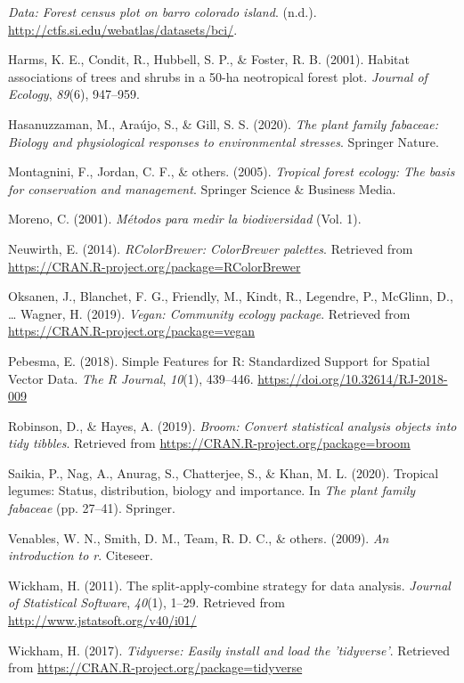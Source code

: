 \documentclass[11pt,]{article}
\begin{document}
\hypertarget{ref-BCIdata}{}
\emph{Data: Forest census plot on barro colorado island}. (n.d.).
\url{http://ctfs.si.edu/webatlas/datasets/bci/}.

\hypertarget{ref-harms2001habitat}{}
Harms, K. E., Condit, R., Hubbell, S. P., \& Foster, R. B. (2001).
Habitat associations of trees and shrubs in a 50-ha neotropical forest
plot. \emph{Journal of Ecology}, \emph{89}(6), 947--959.

\hypertarget{ref-hasanuzzaman2020plant}{}
Hasanuzzaman, M., Araújo, S., \& Gill, S. S. (2020). \emph{The plant
family fabaceae: Biology and physiological responses to environmental
stresses}. Springer Nature.

\hypertarget{ref-montagnini2005tropical}{}
Montagnini, F., Jordan, C. F., \& others. (2005). \emph{Tropical forest
ecology: The basis for conservation and management}. Springer Science \&
Business Media.

\hypertarget{ref-book}{}
Moreno, C. (2001). \emph{Métodos para medir la biodiversidad} (Vol. 1).

\hypertarget{ref-RcolorBrewer}{}
Neuwirth, E. (2014). \emph{RColorBrewer: ColorBrewer palettes}.
Retrieved from \url{https://CRAN.R-project.org/package=RColorBrewer}

\hypertarget{ref-vegan1}{}
Oksanen, J., Blanchet, F. G., Friendly, M., Kindt, R., Legendre, P.,
McGlinn, D., \ldots{} Wagner, H. (2019). \emph{Vegan: Community ecology
package}. Retrieved from \url{https://CRAN.R-project.org/package=vegan}

\hypertarget{ref-sf}{}
Pebesma, E. (2018). Simple Features for R: Standardized Support for
Spatial Vector Data. \emph{The R Journal}, \emph{10}(1), 439--446.
\url{https://doi.org/10.32614/RJ-2018-009}

\hypertarget{ref-broom}{}
Robinson, D., \& Hayes, A. (2019). \emph{Broom: Convert statistical
analysis objects into tidy tibbles}. Retrieved from
\url{https://CRAN.R-project.org/package=broom}

\hypertarget{ref-saikia2020tropical}{}
Saikia, P., Nag, A., Anurag, S., Chatterjee, S., \& Khan, M. L. (2020).
Tropical legumes: Status, distribution, biology and importance. In
\emph{The plant family fabaceae} (pp. 27--41). Springer.

\hypertarget{ref-venables2009introduction}{}
Venables, W. N., Smith, D. M., Team, R. D. C., \& others. (2009).
\emph{An introduction to r}. Citeseer.

\hypertarget{ref-plyr}{}
Wickham, H. (2011). The split-apply-combine strategy for data analysis.
\emph{Journal of Statistical Software}, \emph{40}(1), 1--29. Retrieved
from \url{http://www.jstatsoft.org/v40/i01/}

\hypertarget{ref-tydiverse}{}
Wickham, H. (2017). \emph{Tidyverse: Easily install and load the
'tidyverse'}. Retrieved from
\url{https://CRAN.R-project.org/package=tidyverse}




\newpage
\singlespacing 
\end{document}

